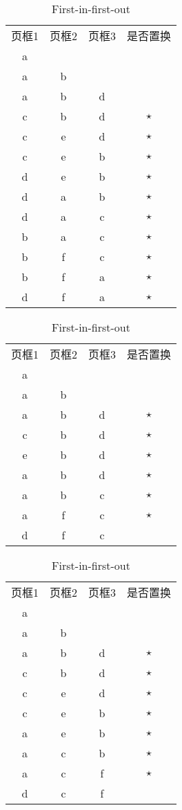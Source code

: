 \documentclass[UTF8]{ctexart}
\begin{document}
    \begin{table}
        \centering
        \caption{First-in-first-out}
        \label{ref1}
        \begin{tabular}{cccc}
        \hline
        页框1&页框2&页框3&是否置换\\
        a&&&\\
        a&b&&\\
        a&b&d&\\
        c&b&d&$\star$\\
        c&e&d&$\star$\\
        c&e&b&$\star$\\
        d&e&b&$\star$\\
        d&a&b&$\star$\\
        d&a&c&$\star$\\
        b&a&c&$\star$\\
        b&f&c&$\star$\\
        b&f&a&$\star$\\
        d&f&a&$\star$\\
        \hline
        \end{tabular}
        \begin{tabular}{cccc}
        \hline
        页框1&页框2&页框3&是否置换\\
        a&&\\
        a&b&\\
        a&b&d&$\star$\\
        c&b&d&$\star$\\
        e&b&d&$\star$\\
        a&b&d&$\star$\\
        a&b&c&$\star$\\
        a&f&c&$\star$\\
        d&f&c&\\
        \hline
        \end{tabular}
        \begin{tabular}{cccc}
        \hline
        页框1&页框2&页框3&是否置换\\
        a&&\\
        a&b&\\
        a&b&d&$\star$\\
        c&b&d&$\star$\\
        c&e&d&$\star$\\
        c&e&b&$\star$\\
        a&e&b&$\star$\\
        a&c&b&$\star$\\
        a&c&f&$\star$\\
        d&c&f&\\
        \hline
        \end{tabular}
    \end{table}
    
\end{document}
